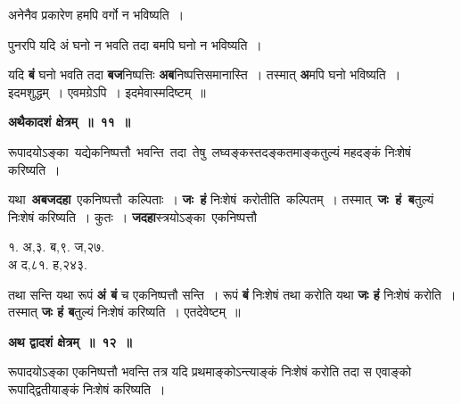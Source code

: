 \documentclass[11pt, openany]{book}
\begin{document}
 अनेनैव प्रकारेण हमपि वर्गो न भविष्यति~। \\
\vspace{-2mm}

 पुनरपि यदि अं घनो न भवति तदा बमपि घनो न भविष्यति~। 

\newpage
\noindent यदि \textbf{बं} घनो भवति तदा \textbf{बज}निष्पत्तिः \textbf{अब}निष्पत्तिसमानास्ति~। तस्मात् \textbf{अ}मपि घनो भविष्यति~। इदमशुद्धम्~। एवमग्रेऽपि~। इदमेवास्मदिष्टम्~॥ 
\vspace{2mm}

\begin{center}
\textbf{ अथैकादशं क्षेत्रम्~॥~११~॥}
\end{center}

{\ab रूपादयोऽङ्का \,यद्येकनिष्पत्तौ \,भवन्ति \,तदा \,तेषु \,लघ्वङ्कस्तदङ्कतमाङ्कतुल्यं महदङ्कं निःशेषं करिष्यति~।} 

\begin{flushleft}
\begin{minipage}[t]{0.65\textwidth}
\hspace{4mm} यथा \,\textbf{अबजदहा} \,एकनिष्पत्तौ \,कल्पिताः~। \textbf{जः \,हं} निःशेषं \,करोतीति \,कल्पितम्~। तस्मात् \,\textbf{जः \,हं \,ब}तुल्यं निःशेषं करिष्यति~। कुतः~। \textbf{जदहा}स्त्रयोऽङ्का \,एकनिष्पत्तौ
\end{minipage} 
\hfill
\begin{minipage}[t]{0.25\textwidth}
१. अ,३. ब,९. ज,२७.\\
{\color{white}अ} द,८१. ह,२४३.
\end{minipage}
\end{flushleft}
\vspace{-3mm}

\noindent तथा सन्ति यथा रूपं \textbf{अं बं} च एकनिष्पत्तौ सन्ति~। रूपं \textbf{बं} निःशेषं तथा करोति यथा \textbf{जः हं} निःशेषं करोति~। तस्मात् \textbf{जः हं ब}तुल्यं निःशेषं करिष्यति~। एतदेवेष्टम्~॥
\vspace{2mm}

\begin{center}
\textbf{\large अथ द्वादशं क्षेत्रम्~॥~१२~॥}
\end{center}

{\ab रूपादयोऽङ्का एकनिष्पत्तौ भवन्ति तत्र यदि प्रथमाङ्कोऽन्त्याङ्कं निःशेषं करोति तदा स एवाङ्को रूपाद्द्वितीयाङ्कं निःशेषं करिष्यति~।}
\end{document}
